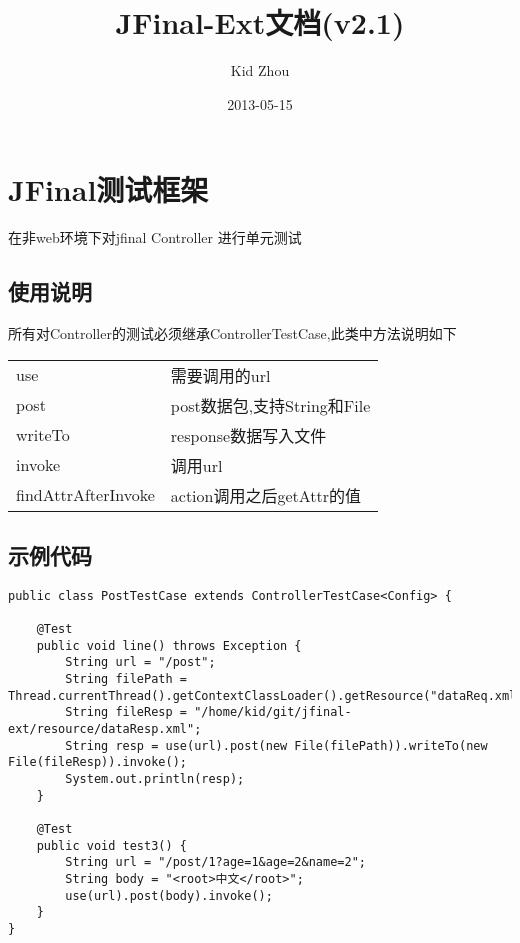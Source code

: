 \documentclass{scrartcl}
\title{JFinal-Ext文档(v2.1)}
\author{Kid Zhou}
\date{2013-05-15}
\begin{document}
\maketitle

\setcounter{tocdepth}{3}
\tableofcontents
\vspace*{1cm}

\section{JFinal测试框架}
\label{sec-1}

  在非web环境下对jfinal Controller 进行单元测试
\subsection{使用说明}
\label{sec-1-1}

 所有对Controller的测试必须继承ControllerTestCase,此类中方法说明如下

\begin{tabular}{ll}
 use                  &  需要调用的url                \\
 post                 &  post数据包,支持String和File  \\
 writeTo              &  response数据写入文件         \\
 invoke               &  调用url                      \\
 findAttrAfterInvoke  &  action调用之后getAttr的值    \\
\end{tabular}
\subsection{示例代码}
\label{sec-1-2}


\begin{verbatim}
public class PostTestCase extends ControllerTestCase<Config> {

    @Test
    public void line() throws Exception {
        String url = "/post";
        String filePath = Thread.currentThread().getContextClassLoader().getResource("dataReq.xml").getFile();
        String fileResp = "/home/kid/git/jfinal-ext/resource/dataResp.xml";
        String resp = use(url).post(new File(filePath)).writeTo(new File(fileResp)).invoke();
        System.out.println(resp);
    }

    @Test
    public void test3() {
        String url = "/post/1?age=1&age=2&name=2";
        String body = "<root>中文</root>";
        use(url).post(body).invoke();
    }
}
\end{verbatim}
    
\end{document}
